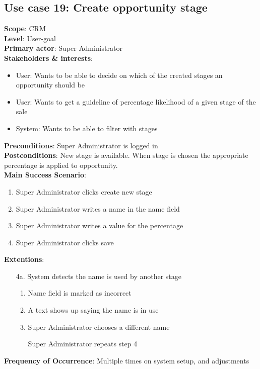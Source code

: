 \subsection{Use case 19: Create opportunity stage}
\textbf{Scope}: CRM \\
\textbf{Level}: User-goal \\
\textbf{Primary actor}: Super Administrator \\
\textbf{Stakeholders \& interests}:
\begin{itemize}
  \item User: Wants to be able to decide on which of the created stages an opportunity should be
  \item User: Wants to get a guideline of percentage likelihood of a given stage of the sale
  \item System: Wants to be able to filter with stages
\end{itemize}
\textbf{Preconditions}: Super Administrator is logged in \\
\textbf{Postconditions}: New stage is available. When stage is chosen the appropriate percentage is applied to opportunity.\\
\textbf{Main Success Scenario}:
\begin{enumerate}
  \item Super Administrator clicks create new stage
  \item Super Administrator writes a name in the name field
  \item Super Administrator writes a value for the percentage
  \item Super Administrator clicks save
\end{enumerate}
\textbf{Extentions}:
\begin{itemize}
  \item [4a.] System detects the name is used by another stage
  \begin{enumerate}
    \item Name field is marked as incorrect
    \item A text shows up saying the name is in use
    \item Super Administrator chooses a different name
    \item [] Super Administrator repeats step 4
  \end{enumerate}
\end{itemize}
\textbf{Frequency of Occurrence}: Multiple times on system setup, and adjustments

